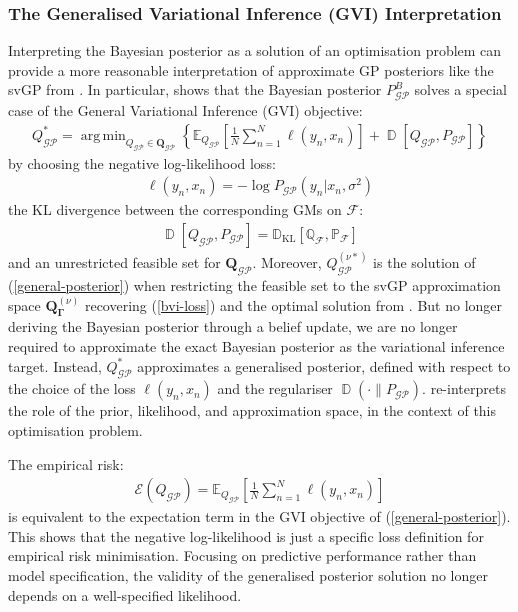 \documentclass{article}
\newcommand{\KLD}{\operatorname{\mathbb{D}_{KL}}}
\newcommand{\D}{\operatorname{\mathbb{D}}}
\newcommand{\GP}{\operatorname{\mathcal{GP}}}
\DeclareMathOperator*{\argmin}{arg\,min}
\numberwithin{equation}{section}
\begin{document}
\subsubsection{The Generalised Variational Inference (GVI) Interpretation}
Interpreting the Bayesian posterior as a solution of an optimisation problem can provide a more reasonable interpretation of approximate GP posteriors like the svGP from \cite{titsias2009variational}. In particular, \cite{knoblauch2022optimization} shows that the Bayesian posterior $P_{\GP}^B$ solves a special case of the General Variational Inference (GVI) objective:
\begin{align}
Q_{\GP}^* = \argmin_{Q_{\GP} \in \boldsymbol{Q}_{\GP}} \left\{ \mathbb{E}_{Q_{\GP}}\left[\frac{1}{N}\sum_{n=1}^N \ell(y_n, x_n)\right] + \D\left[Q_{\GP}, P_{\GP}\right]\right\}
\label{general-posterior}
\end{align}
by choosing the negative log-likelihood loss:
\begin{align}
    \ell(y_n, x_n) = -\log P_{\GP}\left(y_n \vert x_n, \sigma^2\right)
\end{align}
the KL divergence between the corresponding GMs on $\mathcal{F}$:
\begin{align}
    \D\left[Q_{\GP}, P_{\GP}\right] = \KLD\left[\mathbb{Q}_{\mathcal{F}}, \mathbb{P}_{\mathcal{F}}\right]
\end{align}
and an unrestricted feasible set for $\boldsymbol{Q}_{\GP}$. Moreover, $Q_{\GP}^{(\nu*)}$ is the solution of (\ref{general-posterior}) when restricting the feasible set to the svGP approximation space $\boldsymbol{Q}_{\boldsymbol{\Gamma}}^{(\nu)}$ recovering (\ref{bvi-loss}) and the optimal solution from \cite{titsias2009variational}. But no longer deriving the Bayesian posterior through a belief update, we are no longer required to approximate the exact Bayesian posterior as the variational inference target. Instead, $Q_{\GP}^*$ approximates a generalised posterior, defined with respect to the choice of the loss $\ell(y_n, x_n)$ and the regulariser $\D\left(\cdot \| P_{\GP}\right)$.  \cite{knoblauch2022optimization} re-interprets the role of the prior, likelihood, and approximation space, in the context of this optimisation problem.

The empirical risk: 
\begin{align}
\mathcal{E}(Q_{\GP}) = \mathbb{E}_{Q_{\GP}}\left[\frac{1}{N}\sum_{n=1}^N \ell\left(y_n, x_n\right)\right]
\label{empirical-risk}
\end{align}
is equivalent to the expectation term in the GVI objective of (\ref{general-posterior}). This shows that the negative log-likelihood is just a specific loss definition for empirical risk minimisation. Focusing on predictive performance rather than model specification, the validity of the generalised posterior solution no longer depends on a well-specified likelihood.
\end{document}
